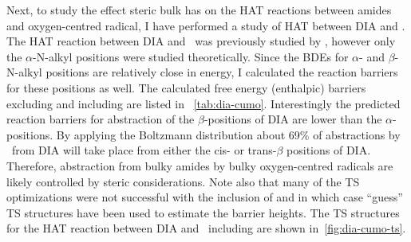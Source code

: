 Next, to study the effect steric bulk has on the HAT reactions between amides
and oxygen-centred radical, I have performed a study of HAT between DIA and
\cumo. The HAT reaction between DIA and \cumo\ was previously studied by
\citet{Salamone2014}, however only the $\alpha$-N-alkyl positions were studied
theoretically. Since the BDEs for $\alpha$- and $\beta$-N-alkyl 
positions are relatively close in energy, I calculated the reaction barriers
for these positions as well. The calculated free energy (enthalpic) barriers
excluding and including  are listed in ~\ref{tab:dia-cumo}.
Interestingly the predicted reaction barriers for abstraction of the
$\beta$-positions of DIA are lower than the $\alpha$-positions. By applying the
Boltzmann distribution about 69\% of abstractions by \cumo\ from DIA will take
place from either the cis- or trans-$\beta$ positions of DIA. Therefore,
abstraction from bulky amides by bulky oxygen-centred radicals are likely
controlled by steric considerations. Note also that many of the TS
optimizations were not successful with the inclusion of  and in which
case ``guess'' TS structures have been used to estimate the barrier heights.
The TS structures for the HAT reaction between DIA and \cumo\ including
 are shown in~\ref{fig:dia-cumo-ts}.

